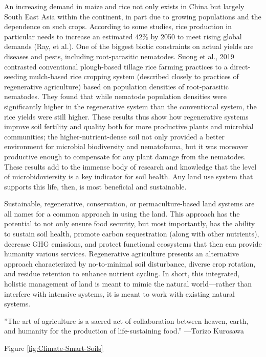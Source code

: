 \documentclass{book}\usepackage{knitr}
\begin{document}
An increasing demand in maize and rice not only exists  in China but largely South East Asia within the continent, in part due to growing populations and the dependence on such crops. According to some studies, rice production in particular needs to increase an estimated 42\% by 2050 to meet rising global demands (Ray, et al.). One of the biggest biotic constraints on actual yields are diseases and pests, including root-parasitic nematodes. Suong et al., 2019 contrasted conventional plough-based tillage rice farming practices to a direct-seeding mulch-based rice cropping system (described closely to practices of regenerative agriculture) based on population densities of root-parasitic nematodes. They found that while nematode population densities were significantly higher in the regenerative system than the conventional system, the rice yields were still higher. These results thus show how regenerative systems improve soil fertility and quality both for more productive plants and microbial communities; the higher-nutrient-dense soil not only provided a better environment for microbial biodiversity and nematofauna, but it was moreover productive enough to compensate for any plant damage from the nematodes. These results add to the immense body of research and knowledge that the level of microbidoviersity is a key indicator for soil health. Any land use system that supports this life, then, is most beneficial and sustainable.

Sustainable, regenerative, conservation, or permaculture-based land systems are all names for a common approach in using the land. This approach has the potential to not only ensure food security, but most importantly, has the ability to sustain soil health, promote carbon sequestration (along with other nutrients), decrease GHG emissions, and protect functional ecosystems that then can provide humanity various services. Regenerative agriculture presents an alternative approach characterized by no-to-minimal soil disturbance, diverse crop rotation, and residue retention to enhance nutrient cycling. In short, this integrated, holistic management of land is meant to mimic the natural world—rather than interfere with intensive systems, it is meant to work with existing natural systems.

''The art of agriculture is a sacred act of collaboration between heaven, earth, and humanity for the production of life-sustaining food.'' —Torizo Kurosawa

Figure \ref{fig:Climate-Smart-Soils}
\end{document}
